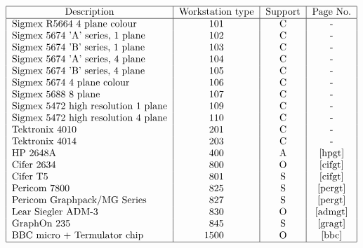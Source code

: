 \begin{table}\caption{Graphics Terminals}\label{terminals}
\[\begin{tabular}{|l|c|c|c|}\hline        
\multicolumn{1}{|c|}{Description} &Workstation type &Support &Page No.\\\hline
Sigmex R5664 4 plane colour         & 101 &C &-\\
Sigmex 5674 'A' series, 1 plane     & 102 &C &-\\
Sigmex 5674 'B' series, 1 plane     & 103 &C &-\\
Sigmex 5674 'A' series, 4 plane     & 104 &C &-\\
Sigmex 5674 'B' series, 4 plane     & 105 &C &-\\
Sigmex 5674 4 plane colour          & 106 &C &-\\
Sigmex 5688 8 plane                 & 107 &C &-\\
Sigmex 5472 high resolution 1 plane & 109 &C &-\\
Sigmex 5472 high resolution 4 plane & 110 &C &-\\
Tektronix 4010                      & 201 &C &-\\
Tektronix 4014                      & 203 &C &-\\
HP 2648A                            & 400 &A &\pageref{hpgt}\\  
Cifer 2634                          & 800 &O &\pageref{cifgt}\\
Cifer T5                            & 801 &S &\pageref{cifgt}\\
Pericom 7800                        & 825 &S &\pageref{pergt}\\
Pericom Graphpack/MG Series         & 827 &S &\pageref{pergt}\\
Lear Siegler ADM-3                  & 830 &O &\pageref{admgt}\\
GraphOn 235                         & 845 &S &\pageref{gragt}\\
BBC micro + Termulator chip         & \makebox[0pt][r]{1}500&O
&\pageref{bbc}\\    
\hline\end{tabular}\]\end{table}

